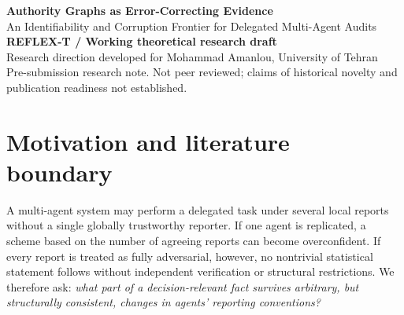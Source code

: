 \documentclass[10pt,a4paper]{article}
\theoremstyle{definition}\newtheorem{definition}[theorem]{Definition}
\begin{document}
\begin{center}
{\Large\bfseries\textcolor{deep}{Authority Graphs as Error-Correcting Evidence}}\\[4pt]
{\large\textcolor{turq}{An Identifiability and Corruption Frontier for Delegated Multi-Agent Audits}}\\[9pt]
{\normalsize\bfseries REFLEX-T / Working theoretical research draft}\\[3pt]
{\small Research direction developed for Mohammad Amanlou, University of Tehran}\\[3pt]
{\footnotesize\textcolor{graytone}{Pre-submission research note. Not peer reviewed; claims of historical novelty and publication readiness not established.}}
\end{center}
\par\vspace{4pt}
\vspace{-5pt}
\begin{abstract}
\noindent Delegated AI systems may contain multiple autonomous agents reporting evidence on behalf of the same principal. A central difficulty is that their reports can be distorted by shared reporting conventions or strategic preferences, while audit authority is restricted. We introduce a deliberately narrow \emph{authority-gated audit graph} model in which an unknown decision-relevant bit is encoded in pairwise audits, agents possess unrestricted but consistent latent binary offsets, and a limited number of edge reports may be corrupted. We characterize identifiability by a cycle-space obstruction, exact adversarial corruption tolerance by a coset distance, and the computational boundary between finding a cheapest noiseless witness and computing general robustness. We also give a constructive edge-disjoint-cycle certificate and exact finite-instance tests. The mathematical ingredients overlap classical signed-graph balance, group synchronization, and binary coding; the model and its proof obligations are a starting point for studying \emph{strategically implementable} audit rights, not a claimed new conference-level result. The central open research challenge is to endogenize the audit graph in a multi-principal game and prove that incentive-compatible delegation enforces the consistency assumptions needed for these certificates.
\end{abstract}
\vspace{-5pt}
\section{Motivation and literature boundary}
A multi-agent system may perform a delegated task under several local reports without a single globally trustworthy reporter. If one agent is replicated, a scheme based on the number of agreeing reports can become overconfident. If every report is treated as fully adversarial, however, no nontrivial statistical statement follows without independent verification or structural restrictions. We therefore ask: \emph{what part of a decision-relevant fact survives arbitrary, but structurally consistent, changes in agents' reporting conventions?}
\end{document}
